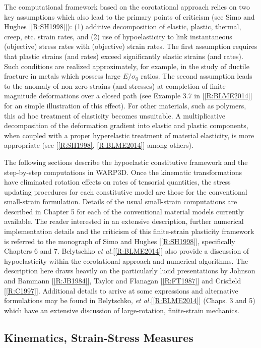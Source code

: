\documentclass[11pt]{report}
\numberwithin{equation}{section}
\newcommand{\ti}{\emph}
\newcommand{\etal}{\ti{et al.}\xspace}
\begin{document}
The computational framework  based on the
corotational approach relies on two key assumptions
which also lead to the primary points of criticism 
(see Simo and Hughes [\ref{R:SH1998}]):
(1) additive decomposition of elastic, plastic, thermal, creep, etc. strain 
rates, and (2) use of hypoelasticity to link
instantaneous (objective) stress rates with (objective) strain rates. 
The first assumption requires that 
plastic strains (and rates) exceed significantly elastic strains (and rates). Such 
conditions are realized approximately, for example, in the study of ductile fracture in metals 
which possess large $E/\sigma_0$ ratios.  The second assumption leads to
the anomaly of non-zero strains (and stresses) at completion  of finite magnitude 
deformations over a closed path (see Example 3.7 in [\ref{R:BLME2014}] for
an simple illustration of this effect). For other materials, such as polymers, 
this ad hoc treatment of elasticity becomes unsuitable. A multiplicative 
decomposition of the deformation gradient into elastic and plastic components, 
when coupled with a proper hyperelastic treatment of material elasticity, is  
more appropriate (see [\ref{R:SH1998}, \ref{R:BLME2014}] among others).

The following sections describe the hypoelastic constitutive 
framework and the step-by-step computations in WARP3D. 
Once the kinematic transformations have eliminated rotation effects 
on rates of tensorial quantities, the stress updating procedures for each 
constitutive model are those for the conventional small-strain formulation. 
Details of the usual small-strain computations are described in 
Chapter 5 for each of the conventional material models currently available.
The reader interested in an extensive description, further numerical implementation 
details and the criticism of this finite-strain plasticity framework is referred to the 
monograph of Simo and Hughes [\ref{R:SH1998}], specifically Chapters 6 and 7.
Belytschko \etal [\ref{R:BLME2014}] also provide a discussion of hypoelasticity within
the corotational  approach and numerical algorithms.  The description here draws
heavily on the particularly lucid presentations by 
Johnson and Bammann [\ref{R:JB1984}], Taylor and Flanagan 
[\ref{R:FT1987}] and Crisfield [\ref{R:C1997}].  Additional details to arrive at 
some expressions and alternative formulations may be found
in Belytschko, \etal [\ref{R:BLME2014}] (Chaps. 3 and 5) which have an extensive 
discussion of large-rotation, finite-strain mechanics.


\subsection{Kinematics, Strain-Stress Measures}
\end{document}
